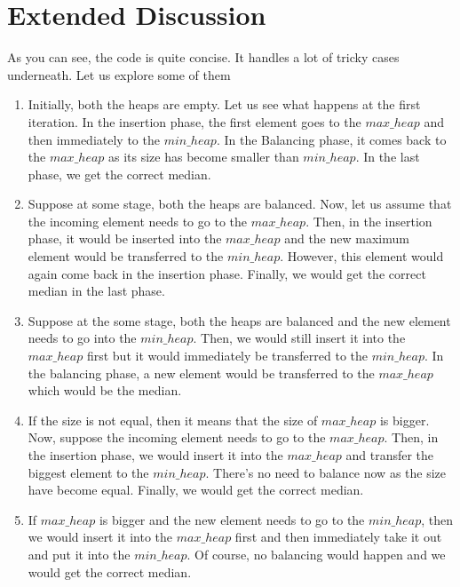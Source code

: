 \documentclass[12pt]{article}
\begin{document}
\pagebreak

\section*{Extended Discussion}
As you can see, the code is quite concise. It handles a lot of tricky cases underneath. Let us explore some of them

\begin{enumerate}
    \item Initially, both the heaps are empty. Let us see what happens at the first iteration. In the insertion phase, the first element goes to the $max\_heap$ and then immediately to the $min\_heap$. In the Balancing phase, it comes back to the $max\_heap$ as its size has become smaller than $min\_heap$. In the last phase, we get the correct median.
    
    \item Suppose at some stage, both the heaps are balanced. Now, let us assume that the incoming element needs to go to the $max\_heap$. Then, in the insertion phase, it would be inserted into the $max\_heap$ and the new maximum element would be transferred to the $min\_heap$. However, this element would again come back in the insertion phase. Finally, we would get the correct median in the last phase.
    
    \item Suppose at the some stage, both the heaps are balanced and the new element needs to go into the $min\_heap$. Then, we would still insert it into the $max\_heap$ first but it would immediately be transferred to the $min\_heap$. In the balancing phase, a new element would be transferred to the $max\_heap$ which would be the median.
    
    \item If the size is not equal, then it means that the size of $max\_heap$ is bigger. Now, suppose the incoming element needs to go to the $max\_heap$. Then, in the insertion phase, we would insert it into the $max\_heap$ and transfer the biggest element to the $min\_heap$. There's no need to balance now as the size have become equal. Finally, we would get the correct median.
    
    \item If $max\_heap$ is bigger and the new element needs to go to the $min\_heap$, then we would insert it into the $max\_heap$ first and then immediately take it out and put it into the $min\_heap$. Of course, no balancing would happen and we would get the correct median. 
\end{enumerate}
\end{document}
